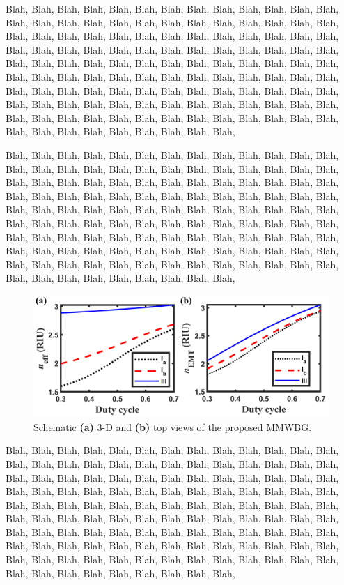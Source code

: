 \documentclass[lettersize,journal]{IEEEtran}
\begin{document}
    Blah, Blah, Blah, Blah, Blah, Blah, Blah, Blah, Blah, Blah, Blah, Blah, Blah, Blah, Blah, Blah, Blah, Blah, 
    Blah, Blah, Blah, Blah, Blah, Blah, Blah, Blah, Blah, Blah, Blah, Blah, Blah, Blah, Blah, Blah, Blah, Blah, 
    Blah, Blah, Blah, Blah, Blah, Blah, Blah, Blah, Blah, Blah, Blah, Blah, Blah, Blah, Blah, Blah, Blah, Blah, 
    Blah, Blah, Blah, Blah, Blah, Blah, Blah, Blah, Blah, Blah, Blah, Blah, Blah, Blah, Blah, Blah, Blah, Blah, 
    Blah, Blah, Blah, Blah, Blah, Blah, Blah, Blah, Blah, Blah, Blah, Blah, Blah, Blah, Blah, Blah, Blah, Blah, 
    Blah, Blah, Blah, Blah, Blah, Blah, Blah, Blah, Blah, Blah, Blah, Blah, Blah, Blah, Blah, Blah, Blah, Blah, 
    Blah, Blah, Blah, Blah, Blah, Blah, Blah, Blah, Blah, Blah, Blah, Blah, Blah, Blah, Blah, Blah, Blah, Blah, 
    
    Blah, Blah, Blah, Blah, Blah, Blah, Blah, Blah, Blah, Blah, Blah, Blah, Blah, Blah, Blah, Blah, Blah, Blah, 
    Blah, Blah, Blah, Blah, Blah, Blah, Blah, Blah, Blah, Blah, Blah, Blah, Blah, Blah, Blah, Blah, Blah, Blah, 
    Blah, Blah, Blah, Blah, Blah, Blah, Blah, Blah, Blah, Blah, Blah, Blah, Blah, Blah, Blah, Blah, Blah, Blah, 
    Blah, Blah, Blah, Blah, Blah, Blah, Blah, Blah, Blah, Blah, Blah, Blah, Blah, Blah, Blah, Blah, Blah, Blah, 
    Blah, Blah, Blah, Blah, Blah, Blah, Blah, Blah, Blah, Blah, Blah, Blah, Blah, Blah, Blah, Blah, Blah, Blah, 
    Blah, Blah, Blah, Blah, Blah, Blah, Blah, Blah, Blah, Blah, Blah, Blah, Blah, Blah, Blah, Blah, Blah, Blah, 
    Blah, Blah, Blah, Blah, Blah, Blah, Blah, Blah, Blah, Blah, Blah, Blah, Blah, Blah, Blah, Blah, Blah, Blah, 
    \begin{figure}[!t]
		\includegraphics{Fig_sample.pdf}
		\centering
		\caption{\label{fig:MMWBGsche}Schematic \textbf{(a)} 3-D and \textbf{(b)} top views of the proposed MMWBG.}
	\end{figure}
    Blah, Blah, Blah, Blah, Blah, Blah, Blah, Blah, Blah, Blah, Blah, Blah, Blah, Blah, Blah, Blah, Blah, Blah, 
    Blah, Blah, Blah, Blah, Blah, Blah, Blah, Blah, Blah, Blah, Blah, Blah, Blah, Blah, Blah, Blah, Blah, Blah, 
    Blah, Blah, Blah, Blah, Blah, Blah, Blah, Blah, Blah, Blah, Blah, Blah, Blah, Blah, Blah, Blah, Blah, Blah, 
    Blah, Blah, Blah, Blah, Blah, Blah, Blah, Blah, Blah, Blah, Blah, Blah, Blah, Blah, Blah, Blah, Blah, Blah, 
    Blah, Blah, Blah, Blah, Blah, Blah, Blah, Blah, Blah, Blah, Blah, Blah, Blah, Blah, Blah, Blah, Blah, Blah, 
    Blah, Blah, Blah, Blah, Blah, Blah, Blah, Blah, Blah, Blah, Blah, Blah, Blah, Blah, Blah, Blah, Blah, Blah, 
    Blah, Blah, Blah, Blah, Blah, Blah, Blah, Blah, Blah, Blah, Blah, Blah, Blah, Blah, Blah, Blah, Blah, Blah, 
    
\end{document}
